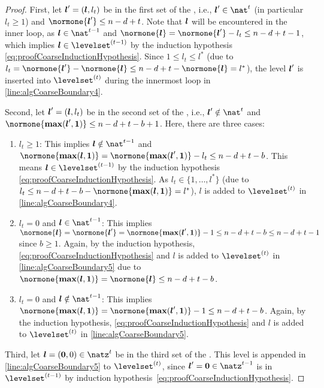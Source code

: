 \begin{proof}
  First, let ${\boldsymbol{l}}' = ({\boldsymbol{l}}, l_t)$ be in the first set of the \rhs,
  i.e., $\*l' \in \nat^t$ (in particular $l_t \ge 1$) and
  $\normone{\*l'} \le n - d + t$.
  Note that ${\boldsymbol{l}}$ will be encountered in the inner loop, as
  $\*l \in \nat^{t-1}$ and
  $\normone{\*l} = \normone{\*l'} - l_t \le n - d + t - 1$,
  which implies $\*l \in \levelset^{(t-1)}$ by the induction
  hypothesis \eqref{eq:proofCoarseInductionHypothesis}.
  Since $1 \le l_t \le l^\ast$
  (due to
  $l_t = \normone{\*l'} - \normone{\*l} \le n-d+t - \normone{\*l} = l^\ast$),
  the level ${\boldsymbol{l}}'$ is inserted into $\levelset^{(t)}$ during the innermost loop
  in \cref{line:algCoarseBoundary4}.
  
  Second, let ${\boldsymbol{l}}' = ({\boldsymbol{l}}, l_t)$
  be in the second set of the \rhs, i.e.,
  $\*l' \notin \nat^t$ and
  $\normone{\vecmax(\*l', \*1)} \le n-d+t-b+1$.
  Here, there are three cases:
  \begin{enumerate}
    \item
    $l_t \ge 1$:
    This implies $\*l \notin \nat^{t-1}$ and 
    $\normone{\vecmax(\*l, \*1)}
    = \normone{\vecmax(\*l', \*1)} - l_t
    \le n-d+t-b$.
    This means $\*l \in \levelset^{(t-1)}$ by the induction hypothesis
    \eqref{eq:proofCoarseInductionHypothesis}.
    As $l_t \in \{1, \dotsc, l^\ast\}$
    (due to $l_t \le n-d+t-b -
    \normone{\vecmax(\*l, \*1)} = l^\ast$),
    $l$ is added to $\levelset^{(t)}$ in \cref{line:algCoarseBoundary4}.
    
    \item
    $l_t = 0$ and $\*l \in \nat^{t-1}$:
    This implies $\normone{\*l} = \normone{\*l'}
    = \normone{\vecmax(\*l', \*1)} - 1
    \le n - d + t - b
    \le n - d + t - 1$ since $b \ge 1$.
    Again, by the induction hypothesis,
    \eqref{eq:proofCoarseInductionHypothesis} and
    $l$ is added to $\levelset^{(t)}$ in \cref{line:algCoarseBoundary5} due to
    $\normone{\vecmax(\*l, \*1)}
    = \normone{\*l} \le n - d + t - b$.
    
    \item
    $l_t = 0$ and $\*l \notin \nat^{t-1}$:
    This implies $\normone{\vecmax(\*l, \*1)}
    = \normone{\vecmax(\*l', \*1)} - 1
    \le n - d + t - b$.
    Again, by the induction hypothesis,
    \eqref{eq:proofCoarseInductionHypothesis} and
    $l$ is added to $\levelset^{(t)}$ in \cref{line:algCoarseBoundary5}.
  \end{enumerate}
  
  Third, let $\*l = (\vec{0}, 0) \in \natz^t$
  be in the third set of the \rhs.
  This level is appended in \cref{line:algCoarseBoundary5}
  to $\levelset^{(t)}$, since $\*l' = \vec{0} \in \natz^{t-1}$ is in $\levelset^{(t-1)}$ by
  induction hypothesis~\eqref{eq:proofCoarseInductionHypothesis}.
\end{proof}
